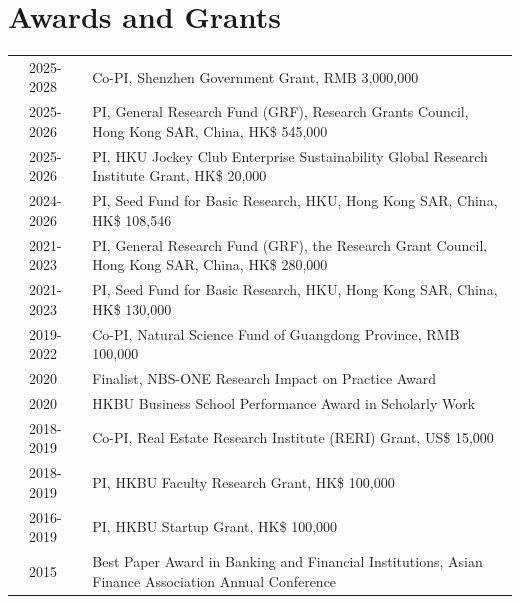 \documentclass[margin,line]{res}
\begin{document}
\begin{resume}
\begin{enumerate}
\end{enumerate}
\iffalse
\section{\sc Awards and Grants}
\vspace{.08cm}
\begin{tabular}{@{}p{0.0 in}p{0.6 in}p{4.60in}}
	& 2025-2028 & Co-PI, Shenzhen Government Grant, RMB 3,000,000 \\
	& 2025-2026 & PI, General Research Fund (GRF), Research Grants Council, Hong Kong SAR, China, HK\$ 545,000 \\
	& 2025-2026 & PI, HKU Jockey Club Enterprise Sustainability Global Research Institute Grant, HK\$ 20,000 \\
	& 2024-2026 & PI, Seed Fund for Basic Research, HKU, Hong Kong SAR, China, HK\$ 108,546 \\
	& 2021-2023 & PI, General Research Fund (GRF), the Research Grant Council, Hong Kong SAR, China, HK\$ 280,000 \\
	& 2021-2023 & PI, Seed Fund for Basic Research, HKU, Hong Kong SAR, China, HK\$ 130,000 \\	
	& 2019-2022   & Co-PI, Natural Science Fund of Guangdong Province, RMB 100,000 \\
	& 2020   & Finalist, NBS-ONE Research Impact on Practice Award \\
	& 2020   & HKBU Business School Performance Award in Scholarly Work \\	
	& 2018-2019   & Co-PI, Real Estate Research Institute (RERI) Grant, US\$ 15,000 \\
	& 2018-2019   & PI, HKBU Faculty Research Grant, HK\$ 100,000 \\
	& 2016-2019   & PI, HKBU Startup Grant, HK\$ 100,000 \\			
	& 2015   & Best Paper Award in Banking and Financial Institutions, Asian Finance Association
	Annual Conference \\		
\end{tabular}




\end{resume}
\end{document}
